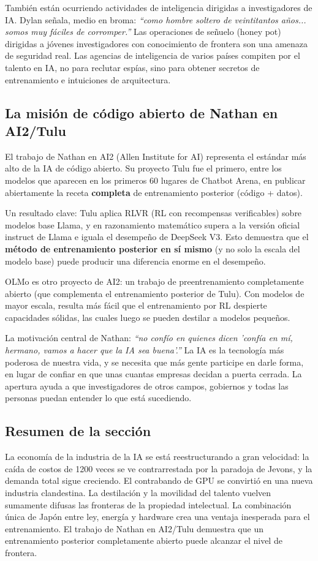 También están ocurriendo actividades de inteligencia dirigidas a investigadores de IA. Dylan señala, medio en broma: \textit{``como hombre soltero de veintitantos años... somos muy fáciles de corromper.''} Las operaciones de señuelo (honey pot) dirigidas a jóvenes investigadores con conocimiento de frontera son una amenaza de seguridad real. Las agencias de inteligencia de varios países compiten por el talento en IA, no para reclutar espías, sino para obtener secretos de entrenamiento e intuiciones de arquitectura.

\subsection{La misión de código abierto de Nathan en AI2/Tulu}

El trabajo de Nathan en AI2 (Allen Institute for AI) representa el estándar más alto de la IA de código abierto. Su proyecto Tulu fue el primero, entre los modelos que aparecen en los primeros 60 lugares de Chatbot Arena, en publicar abiertamente la receta \textbf{completa} de entrenamiento posterior (código + datos).

Un resultado clave: Tulu aplica RLVR (RL con recompensas verificables) sobre modelos base Llama, y en razonamiento matemático supera a la versión oficial instruct de Llama e iguala el desempeño de DeepSeek V3. Esto demuestra que el \textbf{método de entrenamiento posterior en sí mismo} (y no solo la escala del modelo base) puede producir una diferencia enorme en el desempeño.

OLMo es otro proyecto de AI2: un trabajo de preentrenamiento completamente abierto (que complementa el entrenamiento posterior de Tulu). Con modelos de mayor escala, resulta más fácil que el entrenamiento por RL despierte capacidades sólidas, las cuales luego se pueden destilar a modelos pequeños.

La motivación central de Nathan: \textit{``no confío en quienes dicen 'confía en mí, hermano, vamos a hacer que la IA sea buena'.''} La IA es la tecnología más poderosa de nuestra vida, y se necesita que más gente participe en darle forma, en lugar de confiar en que unas cuantas empresas decidan a puerta cerrada. La apertura ayuda a que investigadores de otros campos, gobiernos y todas las personas puedan entender lo que está sucediendo.

\subsection{Resumen de la sección}

La economía de la industria de la IA se está reestructurando a gran velocidad: la caída de costos de 1200 veces se ve contrarrestada por la paradoja de Jevons, y la demanda total sigue creciendo. El contrabando de GPU se convirtió en una nueva industria clandestina. La destilación y la movilidad del talento vuelven sumamente difusas las fronteras de la propiedad intelectual. La combinación única de Japón entre ley, energía y hardware crea una ventaja inesperada para el entrenamiento. El trabajo de Nathan en AI2/Tulu demuestra que un entrenamiento posterior completamente abierto puede alcanzar el nivel de frontera.
